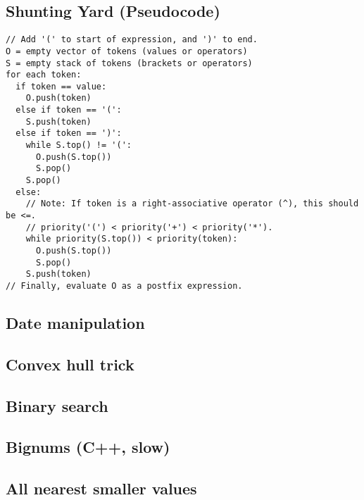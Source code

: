 \documentclass[9pt]{extarticle}
\begin{document}
\begin{multicols}{3}
\subsection{Shunting Yard (Pseudocode)}
\begin{lstlisting}
// Add '(' to start of expression, and ')' to end.
O = empty vector of tokens (values or operators)
S = empty stack of tokens (brackets or operators)
for each token:
  if token == value:
    O.push(token)
  else if token == '(':
    S.push(token)
  else if token == ')':
    while S.top() != '(':
      O.push(S.top())
      S.pop()
    S.pop()
  else:
    // Note: If token is a right-associative operator (^), this should be <=.
	// priority('(') < priority('+') < priority('*').
    while priority(S.top()) < priority(token):
      O.push(S.top())
      S.pop()
    S.push(token)
// Finally, evaluate O as a postfix expression.
\end{lstlisting}

\subsection{Date manipulation}


\subsection{Convex hull trick}


\subsection{Binary search}


\subsection{Bignums (C++, slow)}


\subsection{All nearest smaller values}


\end{multicols}
\end{document}
